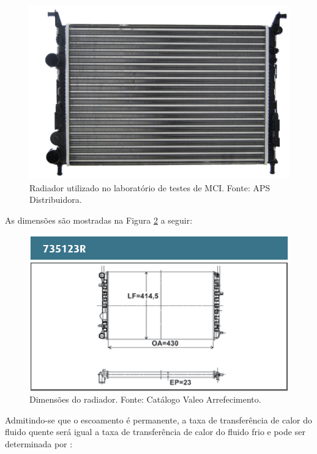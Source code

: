 \begin{figure}[h!]
	\centering
	\includegraphics[keepaspectratio=true,scale= 0.35]{figuras/radiador.png}
	\caption{Radiador utilizado no laboratório de testes de MCI. Fonte: APS Distribuidora.}
	\label{radiador}
\end{figure}

As dimensões são mostradas na Figura \ref{dimensoes-radiador} a seguir:

\begin{figure}[h!]
	\centering
	\includegraphics[keepaspectratio=true,scale= 0.4]{figuras/dimensoes-radiador.png}
	\caption{Dimensões do radiador. Fonte: Catálogo Valeo Arrefecimento.}
	\label{dimensoes-radiador}
\end{figure}

Admitindo-se que o escoamento é permanente, a taxa de transferência de calor do fluido quente será igual a taxa de transferência de calor do fluido frio e pode ser determinada por \cite{energiaTransferencia}:

